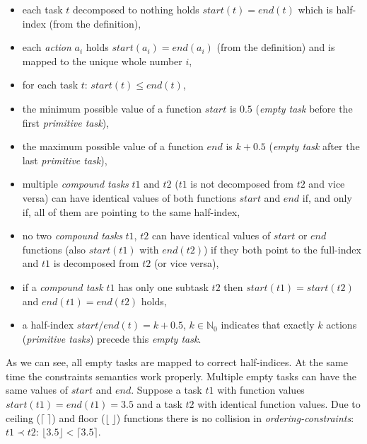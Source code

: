 \begin{itemize}
    \item each task $t$ decomposed to nothing holds $start(t) = end(t)$ which is half-index (from the definition),

    \item each \emph{action} $a_i$ holds $start(a_i) = end(a_i)$ (from the definition) and is mapped to the unique whole number $i$,

    \item for each task $t$: $start(t) \leq end(t)$,

    \item the minimum possible value of a function $start$ is $0.5$ (\emph{empty task} before the first \emph{primitive task}),

    \item the maximum possible value of a function $end$ is $k + 0.5$ (\emph{empty task} after the last \emph{primitive task}),    

    \item multiple \emph{compound tasks} $t1$ and $t2$ ($t1$ is not decomposed from $t2$ and vice versa) can have identical values of both functions $start$ and $end$ if, and only if, all of them are pointing to the same half-index,

    \item no two \emph{compound tasks} $t1$, $t2$ can have identical values of $start$ or $end$ functions (also $start(t1)$ with $end(t2)$) if they both point to the full-index and $t1$ is decomposed from $t2$ (or vice versa),

    \item if a \emph{compound task} $t1$ has only one subtask $t2$ then $start(t1) = start(t2)$ and $end(t1) = end(t2)$ holds,

    \item a half-index $start/end(t) = k + 0.5$, $k \in \mathbb{N}_0$ indicates that exactly $k$ actions (\emph{primitive tasks}) precede this \emph{empty task}.
\end{itemize}

\medskip\noindent
As we can see, all empty tasks are mapped to correct half-indices. At the same time the constraints semantics work properly. Multiple empty tasks can have the same values of $start$ and $end$. Suppose a task $t1$ with function values $start(t1) = end(t1) = 3.5$ and a task $t2$ with identical function values. Due to ceiling ($\lceil \; \rceil$) and floor ($\lfloor \; \rfloor$) functions there is no collision in \emph{ordering-constraints}: $t1 \prec t2$: $\lfloor 3.5 \rfloor < \lceil 3.5 \rceil$. 

